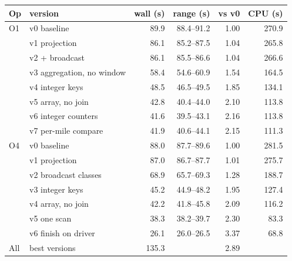 \documentclass[sigconf]{acmart}
\begin{document}
\par\medskip\noindent\begin{minipage}{\columnwidth}
\centering\scriptsize\setlength{\tabcolsep}{3pt}
\begin{tabular}{@{}llrrrr@{}}
\toprule
Op & version & wall (s) & range (s) & vs v0 & CPU (s) \\
\midrule
O1 & v0 baseline & 89.9 & 88.4--91.2 & 1.00 & 270.9 \\
 & v1 projection & 86.1 & 85.2--87.5 & 1.04 & 265.8 \\
 & v2 + broadcast & 86.1 & 85.5--86.6 & 1.04 & 266.6 \\
 & v3 aggregation, no window & 58.4 & 54.6--60.9 & 1.54 & 164.5 \\
 & v4 integer keys & 48.5 & 46.5--49.5 & 1.85 & 134.1 \\
 & v5 array, no join & 42.8 & 40.4--44.0 & 2.10 & 113.8 \\
 & v6 integer counters & 41.6 & 39.5--43.1 & 2.16 & 113.8 \\
 & v7 per-mile compare & 41.9 & 40.6--44.1 & 2.15 & 111.3 \\
\midrule
O4 & v0 baseline & 88.0 & 87.7--89.6 & 1.00 & 281.5 \\
 & v1 projection & 87.0 & 86.7--87.7 & 1.01 & 275.7 \\
 & v2 broadcast classes & 68.9 & 65.7--69.3 & 1.28 & 188.7 \\
 & v3 integer keys & 45.2 & 44.9--48.2 & 1.95 & 127.4 \\
 & v4 array, no join & 42.2 & 41.8--45.8 & 2.09 & 116.2 \\
 & v5 one scan & 38.3 & 38.2--39.7 & 2.30 & 83.3 \\
 & v6 finish on driver & 26.1 & 26.0--26.5 & 3.37 & 68.8 \\
\midrule
All & best versions & 135.3 & & 2.89 & \\
\bottomrule
\end{tabular}
\end{minipage}
\end{document}
